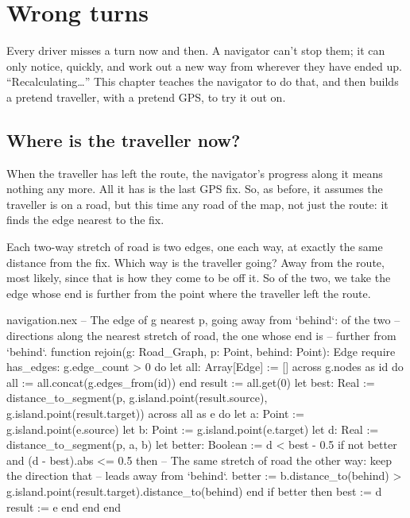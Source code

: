 \chapter{Wrong turns}\label{ch:wrongturn}

Every driver misses a turn now and then. A navigator can't stop them; it
can only notice, quickly, and work out a new way from wherever they have
ended up. ``Recalculating\ldots'' This chapter teaches the navigator to do
that, and then builds a pretend traveller, with a pretend GPS, to try it
out on.

\section{Where is the traveller now?}

When the traveller has left the route, the navigator's progress along it
means nothing any more. All it has is the last GPS fix. So, as before, it
assumes the traveller is on a road, but this time any road of the map, not
just the route: it finds the edge nearest to the fix.

Each two-way stretch of road is two edges, one each way, at exactly the
same distance from the fix. Which way is the traveller going? Away from
the route, most likely, since that is how they come to be off it. So of the
two, we take the edge whose end is further from the point where the
traveller left the route.

\begin{append}{navigation.nex}
-- The edge of g nearest p, going away from `behind`: of the two
-- directions along the nearest stretch of road, the one whose end is
-- further from `behind`.
function rejoin(g: Road_Graph, p: Point, behind: Point): Edge
require
  has_edges: g.edge_count > 0
do
  let all: Array[Edge] := []
  across g.nodes as id do
    all := all.concat(g.edges_from(id))
  end
  result := all.get(0)
  let best: Real := distance_to_segment(p, g.island.point(result.source),
    g.island.point(result.target))
  across all as e do
    let a: Point := g.island.point(e.source)
    let b: Point := g.island.point(e.target)
    let d: Real := distance_to_segment(p, a, b)
    let better: Boolean := d < best - 0.5
    if not better and (d - best).abs <= 0.5 then
      -- The same stretch of road the other way: keep the direction that
      -- leads away from `behind`.
      better := b.distance_to(behind) > g.island.point(result.target).distance_to(behind)
    end
    if better then
      best := d
      result := e
    end
  end
end
\end{append}

